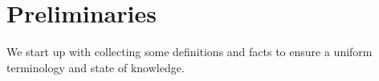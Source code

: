 \chapter{Preliminaries}
\label{sec:preliminaries}

We start up with collecting some definitions and facts to ensure a uniform terminology and state of knowledge.






